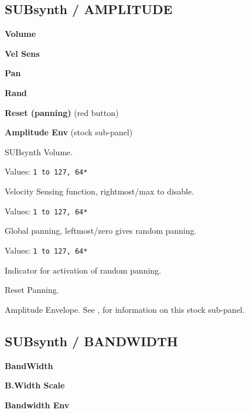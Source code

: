 \subsection{SUBsynth / AMPLITUDE}
\label{subsec:subsynth_amplitude}

   \begin{enumber}
      \item \textbf{Volume}
      \item \textbf{Vel Sens}
      \item \textbf{Pan}
      \item \textbf{Rand}
      \item \textbf{Reset (panning)} (red button)
      \item \textbf{Amplitude Env} (stock sub-panel)
   \end{enumber}

   \setcounter{ItemCounter}{0}      %

   SUBsynth Volume.

   Values: \texttt{1 to 127, 64*}

   Velocity Sensing function, rightmost/max to disable.

   Values: \texttt{1 to 127, 64*}

   Global panning, leftmost/zero gives random panning.

   Values: \texttt{1 to 127, 64*}

   Indicator for activation of random panning.

   Reset Panning.

   Amplitude Envelope.
   See ,
   for information on this stock sub-panel.

\subsection{SUBsynth / BANDWIDTH}
\label{subsec:subsynth_bandwidth}

   \begin{enumber}
      \item \textbf{BandWidth}
      \item \textbf{B.Width Scale}
      \item \textbf{Bandwidth Env}
   \end{enumber}

